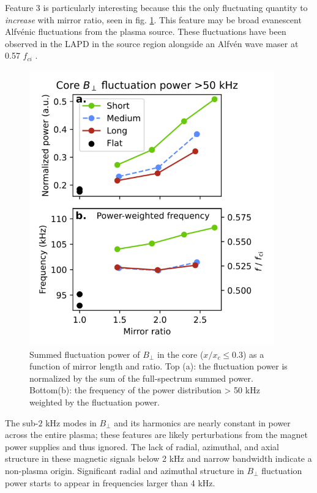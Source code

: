 Feature 3 is particularly interesting because this the only fluctuating quantity to \textit{increase} with mirror ratio, seen in fig. \ref{fig:Bperp_core_highfreq}. This feature may be broad evanescent Alfv\'enic fluctuations from the plasma source. These fluctuations have been observed in the LAPD in the source region alongside an Alfvén wave maser at 0.57 $f_{ci}$ \cite{Maggs_2005}.

\begin{figure}
    \centering
    \includegraphics[width=300pt]{figures/fig15.pdf}
    \caption[Summed fluctuation power of $B_\perp$ in the core]{Summed fluctuation power of $B_\perp$ in the core ($x/x_c \leq 0.3$) as a function of mirror length and ratio. Top (a): the fluctuation power is normalized by the sum of the full-spectrum summed power. Bottom(b): the frequency of the power distribution > 50 kHz weighted by the fluctuation power.}
    \label{fig:Bperp_core_highfreq}
\end{figure}

The sub-$2$ kHz modes in $B_\perp$ and its harmonics are nearly constant in power across the entire plasma; these features are likely perturbations from the magnet power supplies and thus ignored. The lack of radial, azimuthal, and axial structure in these magnetic signals below 2 kHz and narrow bandwidth indicate a non-plasma origin. Significant radial and azimuthal structure in $B_\perp$ fluctuation power starts to appear in frequencies larger than 4 kHz.

